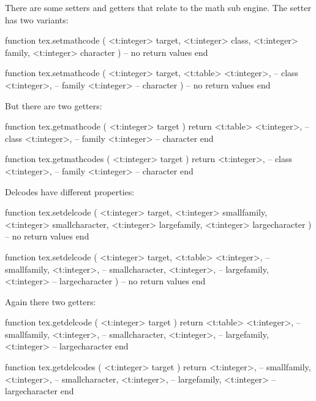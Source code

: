 \stopsubsection

\startsubsection[title=Math]

There are some setters and getters that relate to the math sub engine. The setter has two variants:

\starttyping[option=LUA]
function tex.setmathcode (
    <t:integer> target,
    <t:integer> class,
    <t:integer> family,
    <t:integer> character
)
    -- no return values
end

function tex.setmathcode (
    <t:integer> target,
    <t:table>   {
        <t:integer>, -- class
        <t:integer>, -- family
        <t:integer>  -- character
    }
)
    -- no return values
end
\stoptyping

But there are two getters:

\starttyping[option=LUA]
function tex.getmathcode (
    <t:integer> target
)
    return <t:table> {
        <t:integer>, -- class
        <t:integer>, -- family
        <t:integer>  -- character
    }
end

function tex.getmathcodes (
    <t:integer> target
)
    return
        <t:integer>, -- class
        <t:integer>, -- family
        <t:integer>  -- character
end
\stoptyping

Delcodes have different properties:


\starttyping[option=LUA]
function tex.setdelcode (
    <t:integer> target,
    <t:integer> smallfamily,
    <t:integer> smallcharacter,
    <t:integer> largefamily,
    <t:integer> largecharacter
)
    -- no return values
end

function tex.setdelcode (
    <t:integer> target,
    <t:table>   {
        <t:integer>, -- smallfamily,
        <t:integer>, -- smallcharacter,
        <t:integer>, -- largefamily,
        <t:integer>  -- largecharacter
    }
)
    -- no return values
end
\stoptyping

Again there two getters:

\starttyping[option=LUA]
function tex.getdelcode (
    <t:integer> target
)
    return <t:table> {
        <t:integer>, -- smallfamily,
        <t:integer>, -- smallcharacter,
        <t:integer>, -- largefamily,
        <t:integer>  -- largecharacter
    }
end

function tex.getdelcodes (
    <t:integer> target
)
    return
        <t:integer>, -- smallfamily,
        <t:integer>, -- smallcharacter,
        <t:integer>, -- largefamily,
        <t:integer>  -- largecharacter
 end
\stoptyping

